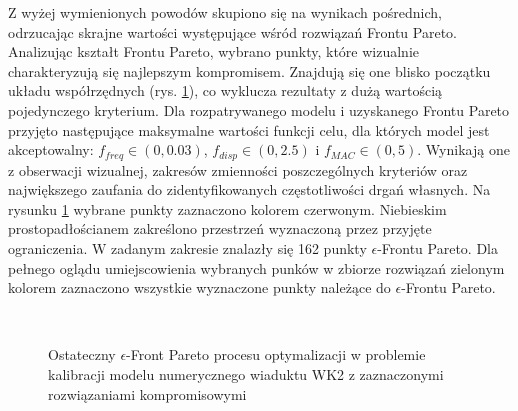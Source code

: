 Z wyżej wymienionych powodów skupiono się na wynikach pośrednich, odrzucając skrajne wartości występujące wśród rozwiązań Frontu Pareto. Analizując kształt Frontu Pareto, wybrano punkty, które wizualnie charakteryzują się najlepszym kompromisem. Znajdują się one blisko początku układu współrzędnych (rys. \ref{fig: calibration_selected}), co wyklucza rezultaty z dużą wartością pojedynczego kryterium. Dla rozpatrywanego modelu i uzyskanego Frontu Pareto przyjęto następujące maksymalne wartości funkcji celu, dla których model jest akceptowalny: $f_{freq} \in (0,0.03)$, $f_{disp} \in (0,2.5)$ i $f_{MAC} \in (0,5)$. Wynikają one z obserwacji wizualnej, zakresów zmienności poszczególnych kryteriów oraz największego zaufania do zidentyfikowanych częstotliwości drgań własnych. Na rysunku \ref{fig: calibration_selected} wybrane punkty zaznaczono kolorem czerwonym. Niebieskim prostopadłościanem zakreślono przestrzeń wyznaczoną przez przyjęte ograniczenia. W zadanym zakresie znalazły się 162 punkty $\epsilon$-Frontu Pareto. Dla pełnego oglądu umiejscowienia wybranych punków w zbiorze rozwiązań zielonym kolorem zaznaczono wszystkie wyznaczone punkty należące do $\epsilon$-Frontu Pareto. 

\begin{figure}[hbt!]
	\centering
	 \\
	\captionsetup{justification=centering}
	\caption{Ostateczny $\epsilon$-Front Pareto procesu optymalizacji w problemie kalibracji modelu numerycznego wiaduktu WK2 z zaznaczonymi rozwiązaniami kompromisowymi}
	\label{fig: calibration_selected}
\end{figure}


